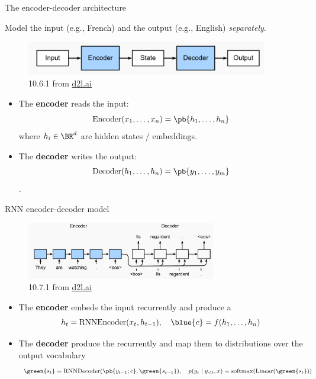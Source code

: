 \documentclass[usenames,dvipsnames,notes,11pt,aspectratio=169,hyperref={colorlinks=true, linkcolor=blue}]{beamer}
\begin{document}
\begin{frame}
    {The encoder-decoder architecture}

    Model the {input} (e.g., French) and the {output} (e.g., English) {\it separately}.\\
    \begin{figure}
        \includegraphics[height=1.5cm]{figures/enc-dec}
        \caption{10.6.1 from \href{https://d2l.ai/chapter_recurrent-modern/encoder-decoder.html}{d2l.ai}}
    \end{figure}

    \pause
    \begin{itemize}
        \item The \textbf{encoder} reads the input:
            $$
            \mathrm{Encoder}(x_1,\ldots,x_n) = \pb{h_1,\ldots,h_n}$$ where $h_i\in\BR^d$ are hidden states / embeddings.
        \pause
        \item The \textbf{decoder}  writes the output:
            $$\mathrm{Decoder}(h_1,\ldots,h_n) = \pb{y_1,\ldots, y_m}$$.
    \end{itemize}
\end{frame}

\begin{frame}
    {RNN encoder-decoder model}
    \begin{figure}
        \includegraphics[height=2.5cm]{figures/rnn-enc-dec}
        \caption{10.7.1 from \href{https://d2l.ai/chapter_recurrent-modern/seq2seq.html}{d2l.ai}}
    \end{figure}
    \vspace{-1em}

    \begin{itemize}
        \item The \textbf{encoder} embeds the input recurrently
            and produce a 
            $$
            h_t = \mathrm{RNNEncoder}(x_t, h_{t-1}), \quad
            \blue{c} = f(h_1,\ldots,h_n)
            $$
        \pause
    \item The \textbf{decoder}  produce the  {recurrently}
            and map them to distributions over the output vocabulary
            $$\green{s_t} = \mathrm{RNNDecoder}(\pb{y_{t-1};c}, \green{s_{t-1}}), \quad
            p(y_t\mid y_{<t}, x) = \mathrm{softmax}(\mathrm{Linear}(\green{s_t}))
            $$
    \end{itemize}
\end{frame}
\end{document}
